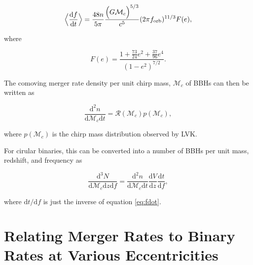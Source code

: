 \documentclass[twocolumn]{aastex631}
\begin{document}
\begin{equation}
    \Big\langle\frac{\mathrm{d}f}{\mathrm{d}t}\Big\rangle = \frac{48 n}{5 \pi} \frac{\Big(G \mathcal{M}_c \Big)^{5/3}}{c^5} (2 \pi f_{\rm orb})^{11/3} F(e), 
    \label{eq:fdot}
\end{equation}

\noindent where 

\begin{equation}
    F(e) = \frac{1 + \frac{73}{24} e^2 + \frac{37}{96} e^4}{(1 - e^2)^{7/2}}.
    \label{eq:eccentricity_enhancement_factor}
\end{equation}

The comoving merger rate density per unit chirp mass, $\mathcal{M}_c$ of BBHs can then be written as

\begin{equation}
    \frac{\mathrm{d}^2n}{\mathrm{d}\mathcal{M}_c \mathrm{d}t} = \mathcal{R}(\mathcal{M}_c) p(\mathcal{M}_c),
    \label{eq:merger_rate_density}
\end{equation}

\noindent where $p(\mathcal{M}_c)$ is the chirp mass distribution observed by LVK. 

For cirular binaries, this can be converted into a number of BBHs per unit mass, redshift, and frequency as

\begin{equation}
    \frac{\mathrm{d}^3N}{\mathrm{d}\mathcal{M}_c \mathrm{d}z \mathrm{d}f} = \frac{\mathrm{d}^2n}{\mathrm{d}\mathcal{M}_c \mathrm{d}t} \frac{\mathrm{d}V}{\mathrm{d}z} \frac{\mathrm{d}t}{\mathrm{d}f},
    \label{eq:rate_per_freq}
\end{equation}

where $\mathrm{d}t / \mathrm{d}f$ is just the inverse of equation \ref{eq:fdot}.

\section{Relating Merger Rates to Binary Rates at Various Eccentricities}
\end{document}
